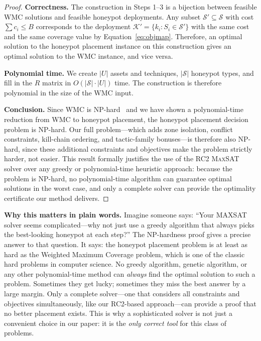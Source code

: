 \documentclass[journal]{IEEEtran}
\newcommand{\maxsat}{\textsc{MaxSAT}}
\newcommand{\calK}{\mathcal{K}}
\begin{document}
\begin{proofbox}
\begin{proof}
\noindent\textbf{Correctness.}
The construction in Steps 1--3 is a bijection between
feasible WMC solutions and feasible honeypot deployments.
Any subset $\mathcal{S}' \subseteq \mathcal{S}$ with cost
$\sum c_i \leq B$ corresponds to the deployment
$\calK' = \{k_i : S_i \in \mathcal{S}'\}$ with the same
cost and the same coverage value by Equation~\eqref{eq:objmap}.
Therefore, an optimal solution to the honeypot placement
instance on this construction gives an optimal solution to
the WMC instance, and vice versa.

\noindent\textbf{Polynomial time.}
We create $|U|$ assets and techniques, $|\mathcal{S}|$
honeypot types, and fill in the $R$ matrix in
$O(|\mathcal{S}| \cdot |U|)$ time.
The construction is therefore polynomial in the size of the
WMC input.

\noindent\textbf{Conclusion.}
Since WMC is NP-hard~\cite{feige1998} and we have shown a
polynomial-time reduction from WMC to honeypot placement,
the honeypot placement decision problem is NP-hard.
Our full problem---which adds zone isolation, conflict
constraints, kill-chain ordering, and tactic-family
bonuses---is therefore also NP-hard, since these additional
constraints and objectives make the problem strictly harder,
not easier.
This result formally justifies the use of the RC2
\maxsat{} solver over any greedy or polynomial-time
heuristic approach: because the problem is NP-hard, no
polynomial-time algorithm can guarantee optimal solutions
in the worst case, and only a complete solver can provide
the optimality certificate our method delivers.
\end{proof}
\end{proofbox}

\begin{examplebox}
\textbf{Why this matters in plain words.}
Imagine someone says: ``Your MAXSAT solver seems
complicated---why not just use a greedy algorithm that
always picks the best-looking honeypot at each step?''
The NP-hardness proof gives a precise answer to that
question.
It says: the honeypot placement problem is at least as hard
as the Weighted Maximum Coverage problem, which is one of
the classic hard problems in computer science.
No greedy algorithm, genetic algorithm, or any other
polynomial-time method can \emph{always} find the optimal
solution to such a problem.
Sometimes they get lucky; sometimes they miss the best
answer by a large margin.
Only a complete solver---one that considers all constraints
and objectives simultaneously, like our RC2-based
approach---can provide a proof that no better placement
exists.
This is why a sophisticated solver is not just a convenient
choice in our paper: it is the \emph{only correct tool}
for this class of problems.
\end{examplebox}
\end{document}
